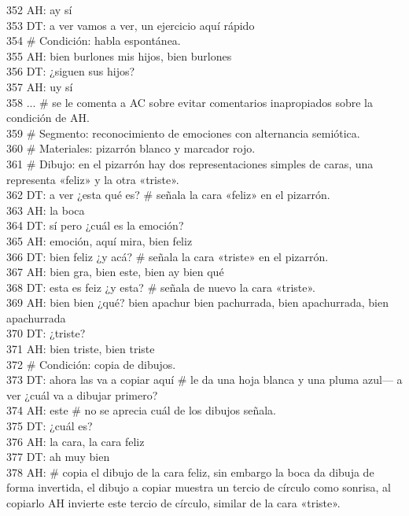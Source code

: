352 AH: ay sí\\
353 DT: a ver vamos a ver, un ejercicio aquí rápido\\
354 \# Condición: habla espontánea.\\
355 AH: bien burlones mis hijos, bien burlones\\
356 DT: ¿siguen sus hijos?\\
357 AH: uy sí\\
358 ... \# se le comenta a AC sobre evitar comentarios inapropiados sobre la condición de AH.\\
359 \# Segmento: reconocimiento de emociones con alternancia semiótica.\\
360 \# Materiales: pizarrón blanco y marcador rojo.\\
361 \# Dibujo: en el pizarrón hay dos representaciones simples de caras, una representa «feliz» y la otra «triste».\\
362 DT: a ver ¿esta qué es? \# señala la cara «feliz» en el pizarrón.\\
363 AH: la boca\\
364 DT: sí pero ¿cuál es la emoción?\\
365 AH: emoción, aquí mira, bien feliz\\
366 DT: bien feliz ¿y acá? \# señala la cara «triste» en el pizarrón.\\
367 AH: bien gra, bien este, bien ay bien qué\\
368 DT: esta es feiz ¿y esta? \# señala de nuevo la cara «triste».\\
369 AH: bien bien ¿qué? bien apachur bien pachurrada, bien apachurrada, bien apachurrada\\
370 DT: ¿triste?\\
371 AH: bien triste, bien triste\\
372 \# Condición: copia de dibujos.\\
373 DT: ahora las va a copiar aquí \# le da una hoja blanca y una pluma azul--- a ver ¿cuál va a dibujar primero?\\
374 AH: este \# no se aprecia cuál de los dibujos señala.\\
375 DT: ¿cuál es?\\
376 AH: la cara, la cara feliz\\
377 DT: ah muy bien\\
378 AH: \# copia el dibujo de la cara feliz, sin embargo la boca da dibuja de forma invertida, el dibujo a copiar muestra un tercio de círculo como sonrisa, al copiarlo AH invierte este tercio de círculo, similar de la cara «triste».\\
